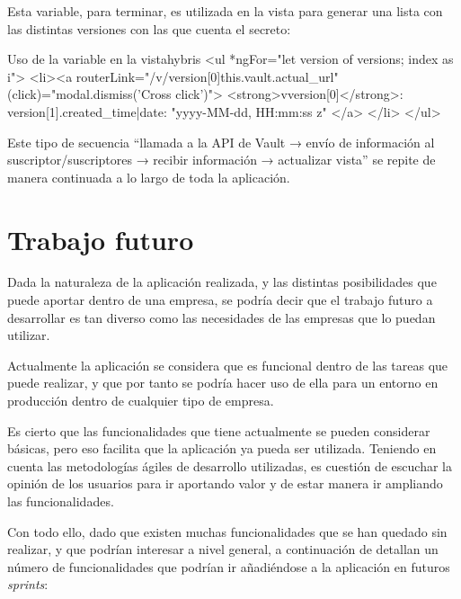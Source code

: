 \documentclass{\ClassPath/viu-tfm-template}
\begin{document}
Esta variable, para terminar, es utilizada en la vista para generar una lista con las distintas versiones con las que cuenta el secreto:

\begin{mycode}{Uso de la variable  en la vista}{hybris}{}
<ul *ngFor="let version of versions; index as i">
  <li><a routerLink="/v/{{version[0]}}{{this.vault.actual_url}}"
    (click)="modal.dismiss('Cross click')">
      <strong>v{{version[0]}}</strong>:
        {{version[1].created_time|date: "yyyy-MM-dd, HH:mm:ss z"}}
    </a>
  </li>
</ul>
\end{mycode}

Este tipo de secuencia “llamada a la API de Vault → envío de información al suscriptor/suscriptores → recibir información → actualizar vista” se repite de manera continuada a lo largo de toda la aplicación.


\chapter{Trabajo futuro}

Dada la naturaleza de la aplicación realizada, y las distintas posibilidades que puede aportar dentro de una empresa, se podría decir que el trabajo futuro a desarrollar es tan diverso como las necesidades de las empresas que lo puedan utilizar.

Actualmente la aplicación se considera que es funcional dentro de las tareas que puede realizar, y que por tanto se podría hacer uso de ella para un entorno en producción dentro de cualquier tipo de empresa.

Es cierto que las funcionalidades que tiene actualmente se pueden considerar básicas, pero eso facilita que la aplicación ya pueda ser utilizada. Teniendo en cuenta las metodologías ágiles de desarrollo utilizadas, es cuestión de escuchar la opinión de los usuarios para ir aportando valor y de estar manera ir ampliando las funcionalidades.

Con todo ello, dado que existen muchas funcionalidades que se han quedado sin realizar, y que podrían interesar a nivel general, a continuación de detallan un número de funcionalidades que podrían ir añadiéndose a la aplicación en futuros \textit{sprints}:
\end{document}
